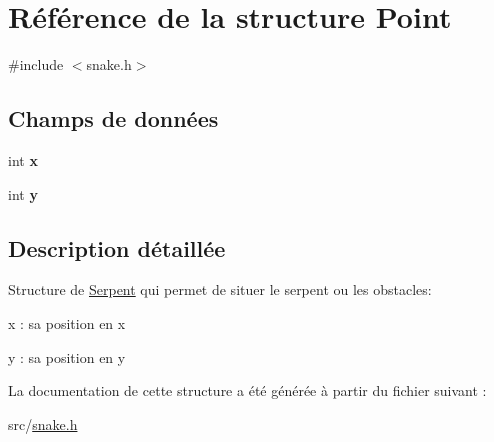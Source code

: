 \hypertarget{struct_point}{}\section{Référence de la structure Point}
\label{struct_point}


{\ttfamily \#include $<$snake.\+h$>$}

\subsection*{Champs de données}
\begin{DoxyCompactItemize}
\item 
int {\bfseries x}\hypertarget{struct_point_a6150e0515f7202e2fb518f7206ed97dc}{}\label{struct_point_a6150e0515f7202e2fb518f7206ed97dc}

\item 
int {\bfseries y}\hypertarget{struct_point_a0a2f84ed7838f07779ae24c5a9086d33}{}\label{struct_point_a0a2f84ed7838f07779ae24c5a9086d33}

\end{DoxyCompactItemize}


\subsection{Description détaillée}
Structure de \hyperlink{struct_serpent}{Serpent} qui permet de situer le serpent ou les obstacles\+:
\begin{DoxyItemize}
\item x \+: sa position en x
\item y \+: sa position en y 
\end{DoxyItemize}

La documentation de cette structure a été générée à partir du fichier suivant \+:\begin{DoxyCompactItemize}
\item 
src/\hyperlink{snake_8h}{snake.\+h}\end{DoxyCompactItemize}
